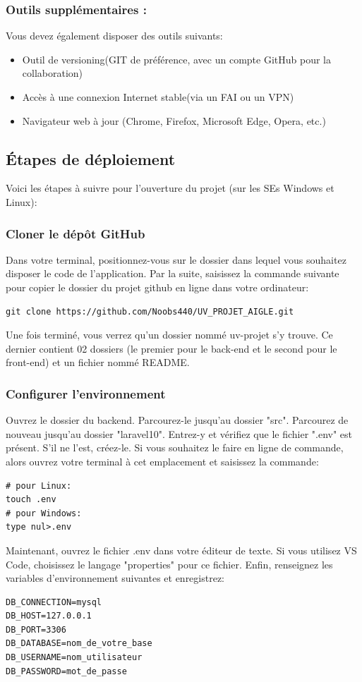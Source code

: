 \documentclass[12pt]{article}
\begin{document}
\subsubsection{Outils supplémentaires :}
Vous devez également disposer des outils suivants:
\begin{itemize}[label=--]
    \item Outil de versioning(GIT de préférence, avec un compte GitHub pour la collaboration)
    \item Accès à une connexion Internet stable(via un FAI ou un VPN)
    \item Navigateur web à jour (Chrome, Firefox, Microsoft Edge, Opera, etc.)
\end{itemize}
\bigskip

\subsection{Étapes de déploiement}
Voici les étapes à suivre pour l’ouverture du projet (sur les SEs Windows et Linux):

\subsubsection{Cloner le dépôt GitHub}
Dans votre terminal, positionnez-vous sur le dossier dans lequel vous souhaitez disposer le code de l'application. Par la suite, saisissez la commande suivante pour copier le dossier du projet github en ligne dans votre ordinateur:
\smallskip
        \begin{lstlisting}
git clone https://github.com/Noobs440/UV_PROJET_AIGLE.git
        \end{lstlisting}
\smallskip

Une fois terminé, vous verrez qu'un dossier nommé uv-projet s'y trouve. Ce dernier contient 02 dossiers (le premier pour le back-end et le second pour le front-end) et un fichier nommé README.
   
\subsubsection{Configurer l’environnement}
Ouvrez le dossier du backend. Parcourez-le jusqu'au dossier "src". Parcourez de nouveau jusqu'au dossier "laravel10". Entrez-y et vérifiez que le fichier ".env" est présent. S'il ne l'est, créez-le. Si vous souhaitez le faire en ligne de commande, alors ouvrez votre terminal à cet emplacement et saisissez la commande: 
\smallskip
        \begin{lstlisting}
# pour Linux:
touch .env
# pour Windows:
type nul>.env
        \end{lstlisting}
\bigskip
Maintenant, ouvrez le fichier .env dans votre éditeur de texte. Si vous utilisez VS Code, choisissez le langage "properties" pour ce fichier. Enfin, renseignez les variables d'environnement suivantes et enregistrez:
        \begin{lstlisting}
DB_CONNECTION=mysql
DB_HOST=127.0.0.1
DB_PORT=3306
DB_DATABASE=nom_de_votre_base
DB_USERNAME=nom_utilisateur
DB_PASSWORD=mot_de_passe
        \end{lstlisting}
\bigskip
\medskip
\end{document}

